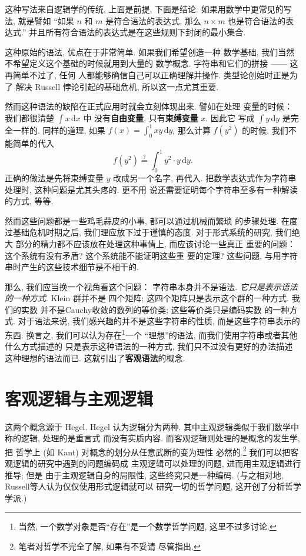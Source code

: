 这种写法来自逻辑学的传统, 上面是前提, 下面是结论.
如果用数学中更常见的写法, 就是譬如
“如果 \(n\) 和 \(m\) 是符合语法的表达式, 那么
\(n \times m\) 也是符合语法的表达式.”
并且所有符合语法的表达式是在这些规则下封闭的最小集合.

这种原始的语法, 优点在于非常简单. 如果我们希望创造一种
数学基础, 我们当然不希望定义这个基础的时候就用到大量的
数学概念. 字符串和它们的拼接 ------ 这再简单不过了, 任何
人都能够确信自己可以正确理解并操作. 类型论创始时正是为了
解决 Russell 悖论引起的基础危机, 所以这一点尤其重要.

然而这种语法的缺陷在正式应用时就会立刻体现出来. 譬如在处理
变量的时候： 我们都很清楚 \(\int x \,\mathrm dx\) 中
没有\textbf{自由变量}, 只有\textbf{束缚变量} \(x\). 因此它
写成 \(\int y \,\mathrm dy\) 是完全一样的. 同样的道理,
如果 \(f(x) = \int_0^1 xy \,\mathrm dy\), 那么计算
\(f(y^2)\) 的时候, 我们不能简单的代入
\[f(y^2) \stackrel?= \int_0^1 y^2 \cdot y\,\mathrm dy.\]
正确的做法是先将束缚变量 \(y\) 改成另一个名字, 再代入.
把数学表达式作为字符串处理时, 这种问题是尤其头疼的. 更不用
说还需要证明每个字符串至多有一种解读的方式, 等等.

然而这些问题都是一些鸡毛蒜皮的小事, 都可以通过机械而繁琐
的步骤处理. 在度过基础危机时期之后,
我们理应放下过于谨慎的态度. 对于形式系统的研究, 我们绝大
部分的精力都不应该放在处理这种事情上, 而应该讨论一些真正
重要的问题： 这个系统有没有矛盾? 这个系统能不能证明这些重
要的定理? 这些问题, 与用字符串时产生的这些技术细节是不相干的.

那么, 我们应当换一个视角看这个问题： 字符串本身并不是语法.
\emph{它只是表示语法的一种方式}. Klein 群并不是
四个矩阵; 这四个矩阵只是表示这个群的一种方式. 我们的实数
并不是Cauchy收敛的数列的等价类; 这些等价类只是编码实数
的一种方式. 对于语法来说, 我们感兴趣的并不是这些字符串的性质,
而是这些字符串表示的东西. 换言之, 我们可以认为存在\footnote{当然,
一个数学对象是否“存在”是一个数学哲学问题, 这里不过多讨论.}一个
“理想”的语法, 而我们使用字符串或者其他什么方式描述的
只是表示这种语法的一种方式, 我们只不过没有更好的办法描述
这种理想的语法而已. 这就引出了\textbf{客观语法}的概念.

\section{客观逻辑与主观逻辑}
这两个概念源于 Hegel. Hegel 认为逻辑分为两种.
其中主观逻辑类似于我们数学中称的逻辑, 处理的是重言式
而没有实质内容. 而客观逻辑则处理的是概念的发生学, 把
哲学上 (如 Kant) 对概念的划分从任意武断的变为理性
必然的.\footnote{笔者对哲学不完全了解, 如果有不妥请
尽管指出.} 我们可以把客观逻辑的研究中遇到的问题编码成
主观逻辑可以处理的问题, 进而用主观逻辑进行推导; 但是
由于主观逻辑自身的局限性, 这些终究只是一种编码.
(与之相对地, Russell等人认为仅仅使用形式逻辑就可以
研究一切的哲学问题, 这开创了分析哲学学派.)

